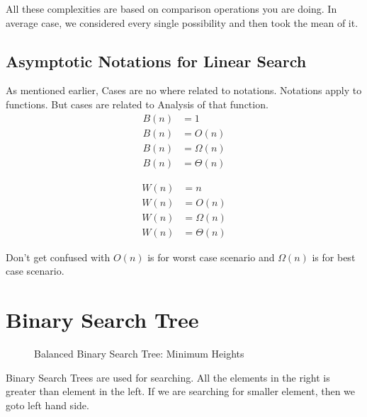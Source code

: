 \documentclass{article}
\begin{document}
All these complexities are based on comparison operations you are doing. In average case, we considered every single possibility and then took the mean of it.

\subsection{Asymptotic Notations for Linear Search}
As mentioned earlier, Cases are no where related to notations. Notations apply to functions. But cases are related to Analysis of that function. 
\[
\begin{aligned}
B(n) &= 1\\
B(n) &= O(n)\\
B(n) &= \Omega(n)\\
B(n) &= \Theta(n)
\end{aligned}
\]

\[
\begin{aligned}
W(n) &= n\\
W(n) &= O(n)\\
W(n) &= \Omega(n)\\
W(n) &= \Theta(n)
\end{aligned}
\]

Don't get confused with $O(n)$ is for worst case scenario and $\Omega(n)$ is for best case scenario.

\section{Binary Search Tree}

\begin{figure}[H]
    \centering
    \caption{Balanced Binary Search Tree: Minimum Heights}
\end{figure}

Binary Search Trees are used for searching. All the elements in the right is greater than element in the left.
If we are searching for smaller element, then we goto left hand side.
\end{document}
